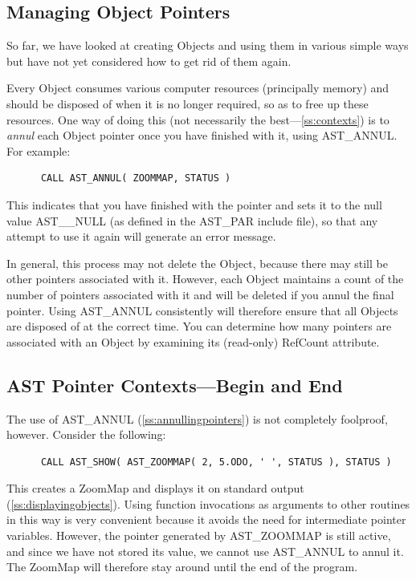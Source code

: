 \documentclass[twoside,11pt]{article}
\newcommand{\htmlref}[2]{#1}
\newcommand{\secref}[1]{\S\ref{#1}}
\renewcommand{\secref}[1]{\ref{#1}}
\begin{document}
\subsection{\label{ss:annullingpointers}Managing Object Pointers}

So far, we have looked at creating Objects and using them in various
simple ways but have not yet considered how to get rid of them again.

Every \htmlref{Object}{Object} consumes various computer resources (principally memory)
and should be disposed of when it is no longer required, so as to free
up these resources. One way of doing this (not necessarily the
best---\secref{ss:contexts}) is to {\em{annul}} each Object pointer once
you have finished with it, using \htmlref{AST\_ANNUL}{AST_ANNUL}. For example:

\small
\begin{verbatim}
      CALL AST_ANNUL( ZOOMMAP, STATUS )
\end{verbatim}
\normalsize

This indicates that you have finished with the pointer and sets it to
the null value AST\_\_NULL (as defined in the AST\_PAR include file),
so that any attempt to use it again will generate an error message.

In general, this process may not delete the Object, because there may
still be other pointers associated with it. However, each Object
maintains a count of the number of pointers associated with it and
will be deleted if you annul the final pointer. Using AST\_ANNUL
consistently will therefore ensure that all Objects are disposed of at
the correct time. You can determine how many pointers are associated
with an Object by examining its (read-only) \htmlref{RefCount}{RefCount} attribute.

\subsection{\label{ss:contexts}AST Pointer Contexts---Begin and End}

The use of \htmlref{AST\_ANNUL}{AST_ANNUL} (\secref{ss:annullingpointers}) is not completely
foolproof, however. Consider the following:

\small
\begin{verbatim}
      CALL AST_SHOW( AST_ZOOMMAP( 2, 5.ODO, ' ', STATUS ), STATUS )
\end{verbatim}
\normalsize

This creates a \htmlref{ZoomMap}{ZoomMap} and displays it on standard output
(\secref{ss:displayingobjects}). Using function invocations as
arguments to other routines in this way is very convenient because it
avoids the need for intermediate pointer variables. However, the
pointer generated by \htmlref{AST\_ZOOMMAP}{AST_ZOOMMAP} is still active, and since we have
not stored its value, we cannot use AST\_ANNUL to annul it. The
ZoomMap will therefore stay around until the end of the program.
\end{document}
